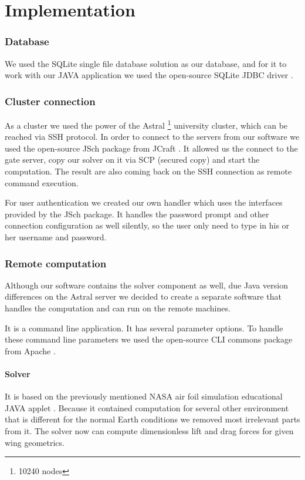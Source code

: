 \documentclass[10pt,a4paper]{report}
\begin{document}
\chapter{Implementation}
\subsection{Database}
We used the SQLite single file database solution as our database, and for it to work with our JAVA application we used the open-source SQLite JDBC driver \cite{WWW:SQLite}.

\subsection{Cluster connection}
As a cluster we used the power of the Astral \footnote{10240 nodes} university cluster, which can be reached via SSH protocol. In order to connect to the servers from our software we used the open-source JSch package from JCraft \cite{WWW:JSCH}. It allowed us the connect to the gate server, copy our solver on it via SCP (secured copy) and start the computation. The result are also coming back on the SSH connection as remote command execution.

For user authentication we created our own handler which uses the interfaces provided by the JSch package. It handles the password prompt and other connection configuration as well silently, so the user only need to type in his or her username and password.

\subsection{Remote computation}
Although our software contains the solver component as well, due Java version differences on the Astral server we decided to create a separate software that handles the computation and can run on the remote machines.

It is a command line application. It has several parameter options. To handle these command line parameters we used the open-source CLI commons package from Apache \cite{WWW:CLI}.

\subsubsection{Solver}
It is based on the previously mentioned NASA air foil simulation educational JAVA applet \cite{WWW:NASA}. Because it contained computation for several other environment that is different for the normal Earth conditions we removed most irrelevant parts from it. The solver now can compute dimensionless lift and drag forces for given wing geometrics.
\end{document}
